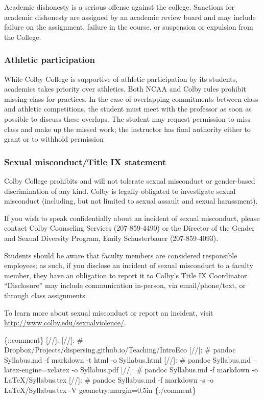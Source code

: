 \documentclass[]{article}
\begin{document}
Academic dishonesty is a serious offense against the college. Sanctions
for academic dishonesty are assigned by an academic review board and may
include failure on the assignment, failure in the course, or suspension
or expulsion from the College.

\subsubsection{Athletic participation }\label{athletic-participation}

While Colby College is supportive of athletic participation by its
students, academics takes priority over athletics. Both NCAA and Colby
rules prohibit missing class for practices. In the case of overlapping
commitments between class and athletic competitions, the student must
meet with the professor as soon as possible to discuss these overlaps.
The student may request permission to miss class and make up the missed
work; the instructor has final authority either to grant or to withhold
permission

\subsubsection{Sexual misconduct/Title IX statement
}\label{sexual-misconducttitle-ix-statement}

Colby College prohibits and will not tolerate sexual misconduct or
gender-based discrimination of any kind. Colby is legally obligated to
investigate sexual misconduct (including, but not limited to sexual
assault and sexual harassment).

If you wish to speak confidentially about an incident of sexual
misconduct, please contact Colby Counseling Services (207-859-4490) or
the Director of the Gender and Sexual Diversity Program, Emily
Schusterbauer (207-859-4093).

Students should be aware that faculty members are considered responsible
employees; as such, if you disclose an incident of sexual misconduct to
a faculty member, they have an obligation to report it to Colby's Title
IX Coordinator. ``Disclosure'' may include communication in-person, via
email/phone/text, or through class assignments.

To learn more about sexual misconduct or report an incident, visit
\url{http://www.colby.edu/sexualviolence/}.

\{::comment\} {[}//{]}: {[}//{]}: \#
Dropbox/Projects/dispersing.github.io/Teaching/IntroEco {[}//{]}: \#
pandoc Syllabus.md -f markdown -t html -o Syllabus.html {[}//{]}: \#
pandoc Syllabus.md --latex-engine=xelatex -o Syllabus.pdf {[}//{]}: \#
pandoc Syllabus.md -f markdown -o LaTeX/Syllabus.tex {[}//{]}: \# pandoc
Syllabus.md -f markdown -s -o LaTeX/Syllabus.tex -V
geometry:margin=0.5in \{:/comment\}
\end{document}
